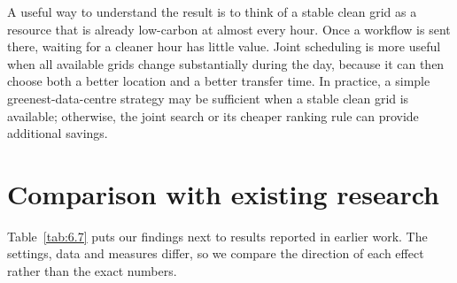 \documentclass[12pt,a4paper,oneside,openany]{report}
\begin{document}
A useful way to understand the result is to think of a stable clean grid
as a resource that is already low-carbon at almost every hour. Once a
workflow is sent there, waiting for a cleaner hour has little value.
Joint scheduling is more useful when all available grids change
substantially during the day, because it can then choose both a better
location and a better transfer time. In practice, a simple
greenest-data-centre strategy may be sufficient when a stable clean grid
is available; otherwise, the joint search or its cheaper ranking rule
can provide additional savings.

\section{Comparison with existing research}\label{sec:6.8}

Table~\ref{tab:6.7} puts our findings next to results reported in earlier work.
The settings, data and measures differ, so we compare the direction of
each effect rather than the exact numbers.
\end{document}
